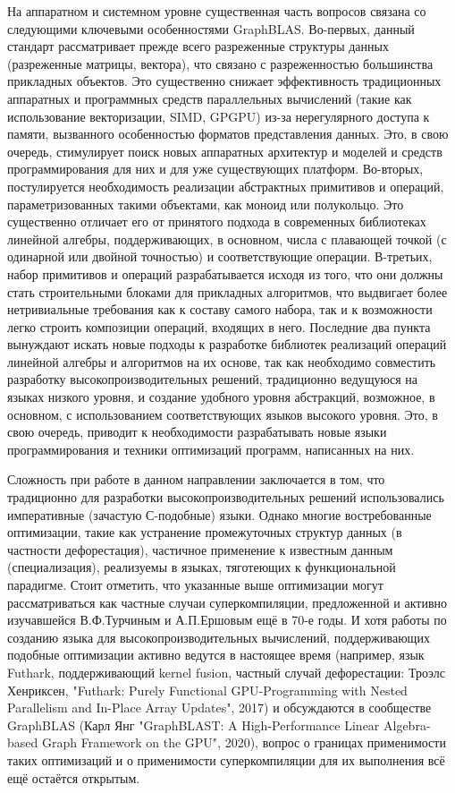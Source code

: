 \documentclass[12pt]{article}  %
\theoremstyle{remark}
\begin{document}
На аппаратном и системном уровне существенная часть вопросов связана со следующими ключевыми особенностями GraphBLAS. Во-первых, данный стандарт рассматривает прежде всего разреженные структуры данных (разреженные матрицы, вектора), что связано с разреженностью большинства прикладных объектов. Это существенно снижает эффективность традиционных аппаратных и программных средств параллельных вычислений (такие как использование векторизации, SIMD, GPGPU) из-за нерегулярного доступа к памяти, вызванного особенностью форматов представления данных. Это, в свою очередь, стимулирует поиск новых аппаратных архитектур и моделей и средств программирования для них и для уже существующих платформ. Во-вторых, постулируется необходимость реализации абстрактных примитивов и операций, параметризованных такими объектами, как моноид или полукольцо. Это существенно отличает его от принятого подхода в современных библиотеках линейной алгебры, поддерживающих, в основном, числа с плавающей точкой (с одинарной или двойной точностью) и соответствующие операции. В-третьих, набор примитивов и операций разрабатывается исходя из того, что они должны стать строительными блоками для прикладных алгоритмов, что выдвигает более нетривиальные требования как к составу самого набора, так и к возможности легко строить композиции операций, входящих в него. Последние два пункта вынуждают искать новые подходы к разработке библиотек реализаций операций линейной алгебры и алгоритмов на их основе, так как необходимо совместить разработку высокопроизводительных решений, традиционно ведущуюся на языках низкого уровня, и создание удобного уровня абстракций, возможное, в основном, с использованием соответствующих языков высокого уровня. Это, в свою очередь, приводит к необходимости разрабатывать новые языки программирования и техники оптимизаций программ, написанных на них.

Сложность при работе в данном направлении заключается в том, что традиционно для разработки высокопроизводительных решений использовались императивные (зачастую С-подобные) языки. Однако многие востребованные оптимизации, такие как устранение промежуточных структур данных (в частности дефорестация), частичное применение к известным данным (специализация), реализуемы в языках, тяготеющих к функциональной парадигме. Стоит отметить, что указанные выше оптимизации могут рассматриваться как частные случаи суперкомпиляции, предложенной и активно изучавшейся В.Ф.Турчиным и А.П.Ершовым ещё в 70-е годы. И хотя работы по созданию языка для высокопроизводительных вычислений, поддерживающих подобные оптимизации активно ведутся в настоящее время (например, язык Futhark, поддерживающий kernel fusion, частный случай дефорестации: Троэлс Хенриксен, "Futhark: Purely Functional GPU-Programming with Nested Parallelism and In-Place Array Updates", 2017) и обсуждаются в сообществе GraphBLAS (Карл Янг "GraphBLAST: A High-Performance Linear Algebra-based Graph Framework on the GPU", 2020), вопрос о границах применимости таких оптимизаций и о применимости суперкомпиляции для их выполнения всё ещё остаётся открытым.
\end{document}
